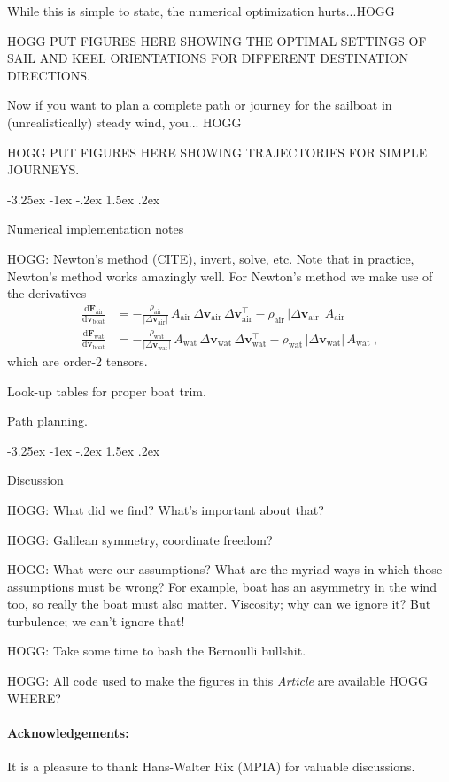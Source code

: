\documentclass{article}
\makeatletter
\newcommand{\dd}{\mathrm{d}}
\renewcommand{\vec}[1]{\boldsymbol{#1}}
\newcommand{\air}{\text{air}}
\newcommand{\water}{\text{wat}}
\newcommand{\boat}{\text{boat}}
\newcommand{\vair}{\vec{v}_\air}
\newcommand{\vwater}{\vec{v}_\water}
\newcommand{\vboat}{\vec{v}_\boat}
\newcommand{\documentname}{\textsl{Article}}
\renewcommand\section{\@startsection {section}{1}{\z@}%
  {-3.25ex \@plus -1ex \@minus -.2ex}%
  {1.5ex \@plus .2ex}%
  {\raggedright\normalfont\large\bfseries}}
\makeatother
\begin{document}
While this is simple to state, the numerical optimization hurts...HOGG

HOGG PUT FIGURES HERE SHOWING THE OPTIMAL SETTINGS OF SAIL AND KEEL ORIENTATIONS FOR DIFFERENT DESTINATION DIRECTIONS.

Now if you want to plan a complete path or journey for the sailboat in (unrealistically) steady wind, you... HOGG

HOGG PUT FIGURES HERE SHOWING TRAJECTORIES FOR SIMPLE JOURNEYS.

\section{Numerical implementation notes}\label{sec:implementation}

HOGG: Newton's method (CITE), invert, solve, etc.
Note that in practice, Newton's method works amazingly well.
For Newton's method we make use of the derivatives
\begin{align}
    \frac{\dd\vec{F}_\air}{\dd\vboat} &= -\frac{\rho_\air}{|\Delta\vair|}\,A_\air\,\Delta\vair\,\Delta\vair^\top-\rho_\air\,|\Delta\vair|\,A_\air
    \\
    \frac{\dd\vec{F}_\water}{\dd\vboat} &= -\frac{\rho_\water}{|\Delta\vwater|}\,A_\water\,\Delta\vwater\,\Delta\vwater^\top-\rho_\water\,|\Delta\vwater|\,A_\water
    ~,
\end{align}
which are order-2 tensors.

Look-up tables for proper boat trim.

Path planning.

\section{Discussion}\label{sec:discussion}

HOGG: What did we find? What's important about that?

HOGG: Galilean symmetry, coordinate freedom?

HOGG: What were our assumptions? What are the myriad ways in which those assumptions must be wrong? For example, boat has an asymmetry in the wind too, so really the boat must also matter. Viscosity; why can we ignore it? But turbulence; we can't ignore that!

HOGG: Take some time to bash the Bernoulli bullshit.

HOGG: All code used to make the figures in this \documentname{} are available HOGG WHERE?

\paragraph{Acknowledgements:}
It is a pleasure to thank Hans-Walter Rix (MPIA) for valuable discussions.

\raggedright
\printbibliography
\end{document}
